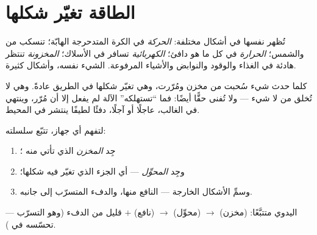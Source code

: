 \section{الطاقة تغيّر شكلها}

\begin{example}\label{ex:g5:everyday-energy:forms}
تُظهر  نفسها في أشكال مختلفة:  \emph{الحركة} في الكرة
المتدحرجة  الهابّة؛  \emph{} تنسكب من 
والشمس؛  \emph{الحرارة} في كل ما هو دافئ؛ 
\emph{الكهربائية} تسافر في الأسلاك؛  \emph{المخزونة}
تنتظر هادئة في الغذاء والوقود والنوابض والأشياء المرفوعة.
الشيء نفسه، وأشكال كثيرة.
\end{example}

\begin{proposition}\label{prop:g5:everyday-energy:chain}
كلما حدث شيء سُحبت  من مخزن ومُرّرت، وهي تغيّر شكلها في
الطريق عادةً. وهي لا تُخلق من لا شيء --- ولا تُفنى حقًّا أيضًا:
فما ``تستهلكه'' الآلة لم يفعل إلا أن مُرّر، وينتهي في الغالب،
عاجلًا أو آجلًا، دفئًا لطيفًا ينتشر في المحيط.
\end{proposition}

\begin{method}\label{met:g5:everyday-energy:read}
لتفهم أي جهاز، تتبّع سلسلته:
\begin{enumerate}
  \item جِد \emph{المخزن} الذي تأتي منه ؛
  \item وجِد \emph{المحوِّل} --- أي الجزء الذي تغيّر فيه 
        شكلها؛
  \item وسمِّ الأشكال الخارجة --- النافع منها، والدفء المتسرّب
        إلى جانبه.
\end{enumerate}
 اليدوي متتبَّعًا:  (مخزن) $\to$  (محوِّل)
$\to$  (نافع) $+$ قليل من الدفء (وهو التسرّب --- تحسّسه في
).
\end{method}

